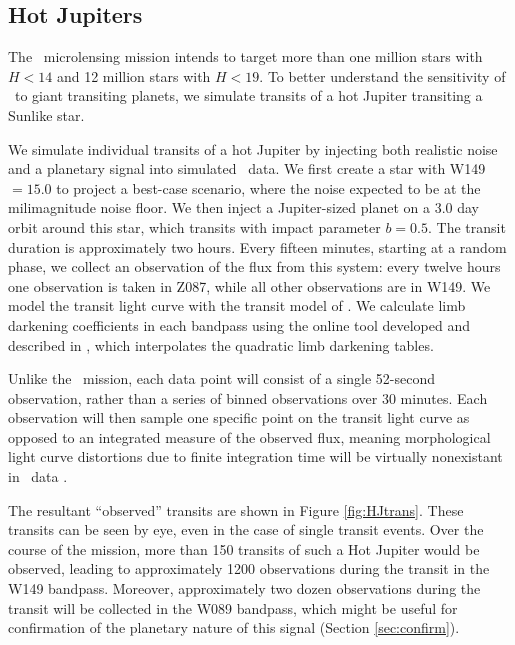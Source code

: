 \subsection{Hot Jupiters}
\label{sec:HJ}

The \WF\ microlensing mission intends to target more than one million stars
with $H < 14$ and 12 million stars with $H < 19$. To better understand the 
sensitivity of \WF\ to giant transiting planets, we simulate transits of a hot Jupiter
transiting a Sunlike star. 

We simulate individual transits of a hot Jupiter by injecting both realistic noise
and a planetary signal into simulated \WF\ data. We first create a star with
W149 $= 15.0$ to project a best-case scenario, where the noise expected to be at
the milimagnitude noise floor.
We then inject a Jupiter-sized planet on a 3.0 day orbit around this star,
which transits with impact parameter $b = 0.5$. 
The transit duration is approximately two hours.
Every fifteen minutes, starting at a random phase, we collect an observation
of the flux from this system: every twelve hours one observation is taken in 
Z087, while all other observations are in W149. 
We model the transit light curve with the transit model of \citet{Mandel02}. 
We calculate limb darkening coefficients in each bandpass using the online tool
developed and described in \citet{Eastman13}, which interpolates the 
\citet{Claret11} quadratic limb darkening tables. 

Unlike the \kep\ mission, each data point will consist of a single 
52-second observation, rather than a series of binned observations over 30 minutes.
Each observation will then sample one specific point on the transit light curve
as opposed to an integrated measure of the observed flux, meaning morphological
light curve distortions due to finite integration time will be virtually nonexistant in
\WF\ data \citep{Kipping10}.

The resultant ``observed'' transits are shown in Figure \ref{fig:HJtrans}.
These transits can be seen by eye, even in the case of single transit events.
Over the course of the mission, more than 150 transits of such a Hot Jupiter would be observed, leading
to approximately 1200 observations during the transit in the W149 bandpass.
Moreover, approximately two dozen observations during the transit will be collected
in the W089 bandpass, which might be useful for confirmation of the planetary 
nature of this signal (Section \ref{sec:confirm}).


